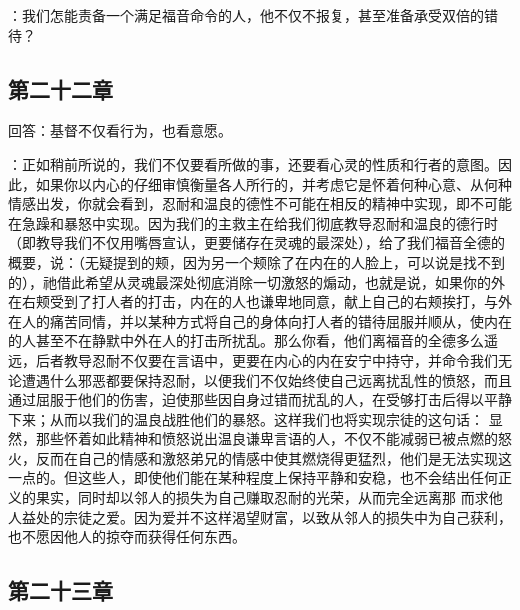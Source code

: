 ：我们怎能责备一个满足福音命令的人，他不仅不报复，甚至准备承受双倍的错待？\par


\subsection{第二十二章}

回答：基督不仅看行为，也看意愿。\par

：正如稍前所说的，我们不仅要看所做的事，还要看心灵的性质和行者的意图。因此，如果你以内心的仔细审慎衡量各人所行的，并考虑它是怀着何种心意、从何种情感出发，你就会看到，忍耐和温良的德性不可能在相反的精神中实现，即不可能在急躁和暴怒中实现。因为我们的主救主在给我们彻底教导忍耐和温良的德行时（即教导我们不仅用嘴唇宣认，更要储存在灵魂的最深处），给了我们福音全德的概要，说：（无疑提到的颊，因为另一个颊除了在内在的人脸上，可以说是找不到的），祂借此希望从灵魂最深处彻底消除一切激怒的煽动，也就是说，如果你的外在右颊受到了打人者的打击，内在的人也谦卑地同意，献上自己的右颊挨打，与外在人的痛苦同情，并以某种方式将自己的身体向打人者的错待屈服并顺从，使内在的人甚至不在静默中外在人的打击所扰乱。那么你看，他们离福音的全德多么遥远，后者教导忍耐不仅要在言语中，更要在内心的内在安宁中持守，并命令我们无论遭遇什么邪恶都要保持忍耐，以便我们不仅始终使自己远离扰乱性的愤怒，而且通过屈服于他们的伤害，迫使那些因自身过错而扰乱的人，在受够打击后得以平静下来；从而以我们的温良战胜他们的暴怒。这样我们也将实现宗徒的这句话： 显然，那些怀着如此精神和愤怒说出温良谦卑言语的人，不仅不能减弱已被点燃的怒火，反而在自己的情感和激怒弟兄的情感中使其燃烧得更猛烈，他们是无法实现这一点的。但这些人，即使他们能在某种程度上保持平静和安稳，也不会结出任何正义的果实，同时却以邻人的损失为自己赚取忍耐的光荣，从而完全远离那 而求他人益处的宗徒之爱。因为爱并不这样渴望财富，以致从邻人的损失中为自己获利，也不愿因他人的掠夺而获得任何东西。\par


\subsection{第二十三章}

